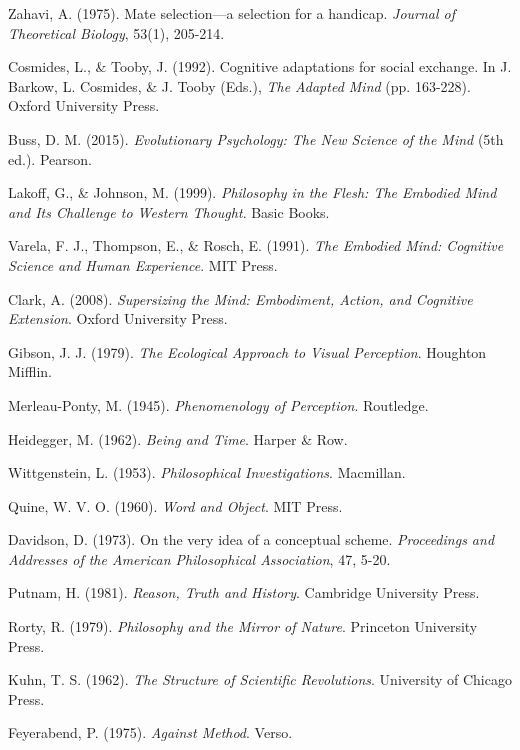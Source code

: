 \documentclass[12pt]{article}
\begin{document}
\begin{thebibliography}{99}
 Zahavi, A. (1975). Mate selection—a selection for a handicap. \textit{Journal of Theoretical Biology}, 53(1), 205-214.

 Cosmides, L., \& Tooby, J. (1992). Cognitive adaptations for social exchange. In J. Barkow, L. Cosmides, \& J. Tooby (Eds.), \textit{The Adapted Mind} (pp. 163-228). Oxford University Press.

 Buss, D. M. (2015). \textit{Evolutionary Psychology: The New Science of the Mind} (5th ed.). Pearson.

 Lakoff, G., \& Johnson, M. (1999). \textit{Philosophy in the Flesh: The Embodied Mind and Its Challenge to Western Thought}. Basic Books.

 Varela, F. J., Thompson, E., \& Rosch, E. (1991). \textit{The Embodied Mind: Cognitive Science and Human Experience}. MIT Press.

 Clark, A. (2008). \textit{Supersizing the Mind: Embodiment, Action, and Cognitive Extension}. Oxford University Press.

 Gibson, J. J. (1979). \textit{The Ecological Approach to Visual Perception}. Houghton Mifflin.

 Merleau-Ponty, M. (1945). \textit{Phenomenology of Perception}. Routledge.

 Heidegger, M. (1962). \textit{Being and Time}. Harper \& Row.

 Wittgenstein, L. (1953). \textit{Philosophical Investigations}. Macmillan.

 Quine, W. V. O. (1960). \textit{Word and Object}. MIT Press.

 Davidson, D. (1973). On the very idea of a conceptual scheme. \textit{Proceedings and Addresses of the American Philosophical Association}, 47, 5-20.

 Putnam, H. (1981). \textit{Reason, Truth and History}. Cambridge University Press.

 Rorty, R. (1979). \textit{Philosophy and the Mirror of Nature}. Princeton University Press.

 Kuhn, T. S. (1962). \textit{The Structure of Scientific Revolutions}. University of Chicago Press.

 Feyerabend, P. (1975). \textit{Against Method}. Verso.


\end{thebibliography}
\end{document}
